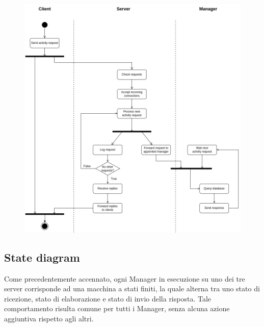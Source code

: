 \documentclass[12pt]{report}
\begin{document}
    \begin{figure}[H]
        \centering
        \includegraphics[scale=0.425]{images/Activity Diagram.png}
        
        \label{fig:activity_diagram}
    \end{figure}
    
    \subsection{State diagram}

    Come precedentemente accennato, ogni Manager in esecuzione su uno dei tre server corrisponde ad una macchina a stati finiti, la quale alterna tra uno stato di ricezione, stato di elaborazione e stato di invio della risposta. Tale comportamento risulta comune per tutti i Manager, senza alcuna azione aggiuntiva rispetto agli altri. 
    
\end{document}
